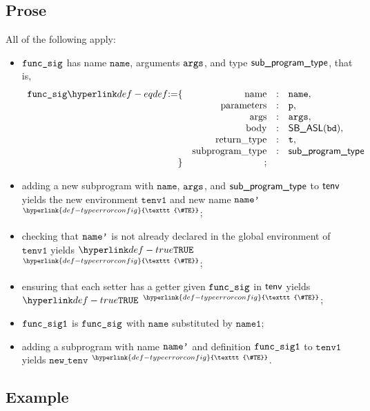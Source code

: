 \documentclass{book}
\newcommand\TypeErrorConfig[0]{\hyperlink{def-typeerrorconfig}{\texttt{\#TE}}}
\newcommand\ProseOrTypeError[0]{\hyperlink{def-proseortypeerror}{$^{\TypeErrorConfig}$}}
\newcommand\newtenv[0]{\texttt{new\_tenv}}
\newcommand\tenvone[0]{\texttt{tenv1}}
\newcommand\vp[0]{\texttt{p}}
\newcommand\vt[0]{\texttt{t}}
\newcommand\nameone[0]{\texttt{name1}}
\newcommand\name[0]{\texttt{name}}
\begin{document}
\subsection{Prose}
All of the following apply:
\begin{itemize}
  \item $\texttt{func\_sig}$ has name $\name$, arguments $\texttt{args}$, and type $\textsf{sub\_program\_type}$, that is,
  \[
    \begin{array}{rrcl}
      \funcsig \eqdef \{
                      & \funcname            &:& \name,\\
                      & \funcparameters      &:& \vp,\\
                      & \funcargs            &:& \vargs,\\
                      & \funcbody            &:& \SBASL(\bd),\\
                      & \funcreturntype      &:& \vt,\\
                      & \funcsubprogramtype  &:& \subprogramtype \\
                  \}  & ; &&
        \end{array}
  \]
  \item adding a new subprogram with $\name$, $\texttt{args}$, and $\textsf{sub\_program\_type}$ to $\textsf{tenv}$ yields the new
        environment $\tenvone$ and new name $\texttt{name'}$ \ProseOrTypeError;
  \item checking that $\texttt{name'}$ is not already declared in the global environment of $\tenvone$
        yields $\True$ \ProseOrTypeError;
  \item ensuring that each setter has a getter given $\texttt{func\_sig}$ in $\textsf{tenv}$ yields $\True$ \ProseOrTypeError;
  \item $\texttt{func\_sig1}$ is $\texttt{func\_sig}$ with $\name$ substituted by $\nameone$;
  \item adding a subprogram with name $\texttt{name'}$ and definition $\texttt{func\_sig1}$ to $\tenvone$ yields $\newtenv$ \ProseOrTypeError.
\end{itemize}

\subsection{Example}

\end{document}
